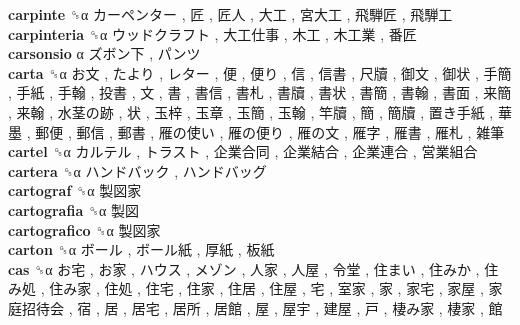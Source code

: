 \textbf{carpinte} ␝α   カーペンター ,  匠 ,  匠人 ,  大工 ,  宮大工 ,  飛騨匠 ,  飛騨工   \\
\textbf{carpinteria} ␝α   ウッドクラフト ,  大工仕事 ,  木工 ,  木工業 ,  番匠   \\
\textbf{carsonsio} α   ズボン下 ,  パンツ   \\
\textbf{carta} ␝α   お文 ,  たより ,  レター ,  便 ,  便り ,  信 ,  信書 ,  尺牘 ,  御文 ,  御状 ,  手簡 ,  手紙 ,  手翰 ,  投書 ,  文 ,  書 ,  書信 ,  書札 ,  書牘 ,  書状 ,  書簡 ,  書翰 ,  書面 ,  来簡 ,  来翰 ,  水茎の跡 ,  状 ,  玉梓 ,  玉章 ,  玉簡 ,  玉翰 ,  竿牘 ,  簡 ,  簡牘 ,  置き手紙 ,  華墨 ,  郵便 ,  郵信 ,  郵書 ,  雁の使い ,  雁の便り ,  雁の文 ,  雁字 ,  雁書 ,  雁札 ,  雑筆   \\
\textbf{cartel} ␝α   カルテル ,  トラスト ,  企業合同 ,  企業結合 ,  企業連合 ,  営業組合   \\
\textbf{cartera} ␝α   ハンドバック ,  ハンドバッグ   \\
\textbf{cartograf} ␝α   製図家   \\
\textbf{cartografia} ␝α   製図   \\
\textbf{cartografico} ␝α   製図家   \\
\textbf{carton} ␝α   ボール ,  ボール紙 ,  厚紙 ,  板紙   \\
\textbf{cas} ␝α   お宅 ,  お家 ,  ハウス ,  メゾン ,  人家 ,  人屋 ,  令堂 ,  住まい ,  住みか ,  住み処 ,  住み家 ,  住処 ,  住宅 ,  住家 ,  住居 ,  住屋 ,  宅 ,  室家 ,  家 ,  家宅 ,  家屋 ,  家庭招待会 ,  宿 ,  居 ,  居宅 ,  居所 ,  居館 ,  屋 ,  屋宇 ,  建屋 ,  戸 ,  棲み家 ,  棲家 ,  館   \\
